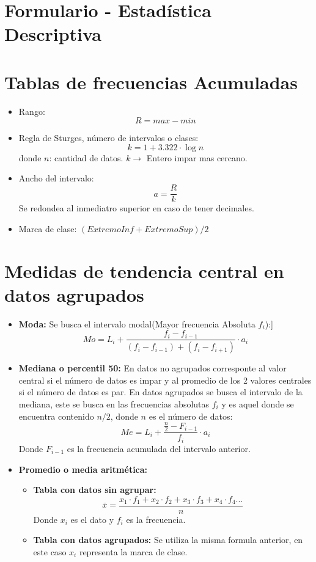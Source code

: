 \documentclass[12pt]{article}
\begin{document}
    \section*{\centering Formulario - Estadística Descriptiva}

    \section{Tablas de frecuencias Acumuladas}
        \begin{itemize}
            \item Rango: \[R = max - min\]
            \item Regla de Sturges, número de intervalos o clases:\[k = 1 + 3.322 \cdot \log{n}\] donde $n$: cantidad de datos. $k \longrightarrow$ Entero impar mas cercano.
            \item Ancho del intervalo: \[a = \frac{R}{k}\] Se redondea al inmediatro superior en caso de tener decimales.
            \item Marca de clase: $(ExtremoInf + ExtremoSup)/2$
        \end{itemize}

    \section{Medidas de tendencia central en datos agrupados}
        \begin{itemize}
            \item \textbf{Moda:} Se busca el intervalo modal(Mayor frecuencia Absoluta $f_{i}$):]
                \[Mo = L_{i} + \frac{f_{i} - f_{i - 1}}{(f_{i} - f_{i - 1}) + (f_{i} - f_{i + 1})} \cdot a_{i}\]

            \item \textbf{Mediana o percentil 50:} En datos no agrupados corresponte al valor central si el número de datos es impar y al promedio de los 2 valores centrales si el número de datos es par.
                En datos agrupados se busca el intervalo de la mediana, este se busca en las frecuencias absolutas $f_{i}$ y es aquel donde se encuentra contenido $n/2$, donde $n$ es el número de datos:
                \[Me = L_{i} + \frac{\frac{n}{2} - F_{i - 1}}{f_{i}} \cdot a_{i}\] Donde $F_{i - 1}$ es la frecuencia acumulada del intervalo anterior.
            
            \item \textbf{Promedio o media aritmética:}
                \begin{itemize}
                    \item \textbf{Tabla con datos sin agrupar:}
                        \[\bar{x} = \frac{x_{1}\cdot f_{1} + x_{2}\cdot f_{2} + x_{3}\cdot f_{3} + x_{4}\cdot f_{4} ...}{n}\] Donde $x_{i}$ es el dato y $f_{i}$ es la frecuencia.

                    \item \textbf{Tabla con datos agrupados:} Se utiliza la misma formula anterior, en este caso $x_{i}$ representa la marca de clase.

                \end{itemize}
        \end{itemize}
\end{document}

